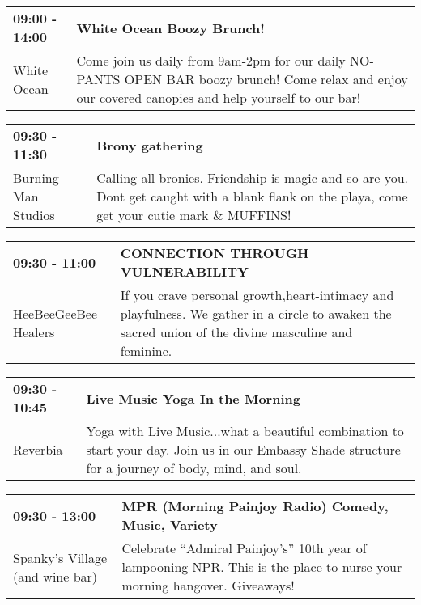 \begin{tabular}{ p{1in} p{2.2in} }
    \textbf{09:00 - 14:00} & \textbf{White Ocean Boozy Brunch!} \\
    White Ocean \newline  & Come join us daily from 9am-2pm for our daily NO-PANTS OPEN BAR boozy brunch! Come relax and enjoy our covered canopies and help yourself to our bar! \\
    \hline 
\end{tabular}
    
\begin{tabular}{ p{1in} p{2.2in} }
    \textbf{09:30 - 11:30} & \textbf{Brony gathering} \\
    Burning Man Studios \newline  & Calling all bronies. Friendship is magic and so are you.  Dont get caught with a blank flank on the playa, come get your cutie mark \& MUFFINS! \\
    \hline 
\end{tabular}
    
\begin{tabular}{ p{1in} p{2.2in} }
    \textbf{09:30 - 11:00} & \textbf{CONNECTION THROUGH VULNERABILITY                  } \\
    HeeBeeGeeBee Healers \newline  & If you crave personal growth,heart-intimacy and playfulness. We gather in a circle to awaken the sacred union of the divine masculine and feminine. \\
    \hline 
\end{tabular}
    
\begin{tabular}{ p{1in} p{2.2in} }
    \textbf{09:30 - 10:45} & \textbf{Live Music Yoga In the Morning } \\
    Reverbia \newline  & Yoga with Live Music...what a beautiful combination to start your day. Join us in our Embassy Shade structure for a journey of body, mind, and soul. \\
    \hline 
\end{tabular}
    
\begin{tabular}{ p{1in} p{2.2in} }
    \textbf{09:30 - 13:00} & \textbf{MPR (Morning Painjoy Radio) Comedy, Music, Variety} \\
    Spanky's Village (and wine bar) \newline  & Celebrate ``Admiral Painjoy's'' 10th year of lampooning NPR.  This is the place to nurse your morning hangover.  Giveaways! \\
    \hline 
\end{tabular}
    

